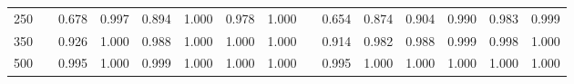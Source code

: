 % 
\begin{tabular}{ccccccccccccccc}
  \hline
  \hline
250 &  & 0.678 & 0.997 & 0.894 & 1.000 & 0.978 & 1.000 &  & 0.654 & 0.874 & 0.904 & 0.990 & 0.983 & 0.999 \\ 
  350 &  & 0.926 & 1.000 & 0.988 & 1.000 & 1.000 & 1.000 &  & 0.914 & 0.982 & 0.988 & 0.999 & 0.998 & 1.000 \\ 
  500 &  & 0.995 & 1.000 & 0.999 & 1.000 & 1.000 & 1.000 &  & 0.995 & 1.000 & 1.000 & 1.000 & 1.000 & 1.000 \\ 
   \hline
\end{tabular}
